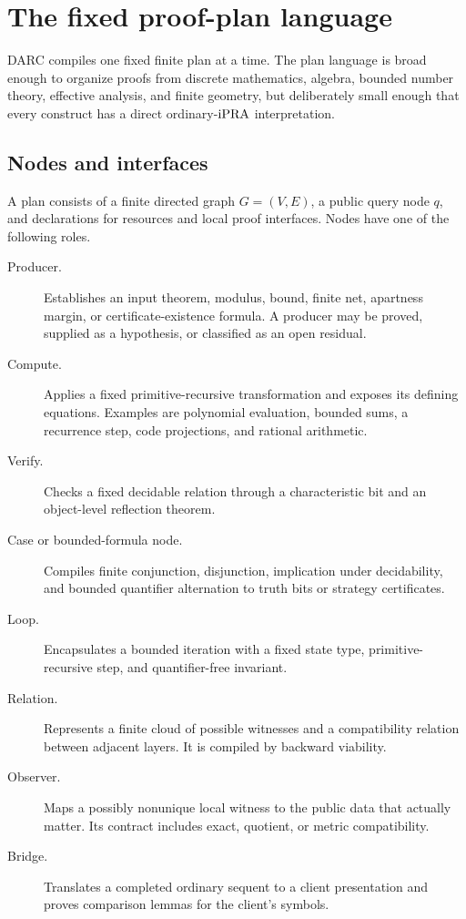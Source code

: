 \section{The fixed proof-plan language}
\label{sec:plan}

DARC compiles one fixed finite plan at a time.  The plan language is broad
enough to organize proofs from discrete mathematics, algebra, bounded number
theory, effective analysis, and finite geometry, but deliberately small enough
that every construct has a direct ordinary-\(\mathrm{iPRA}\) interpretation.

\subsection{Nodes and interfaces}

A plan consists of a finite directed graph \(G=(V,E)\), a public query node
\(q\), and declarations for resources and local proof interfaces.  Nodes have
one of the following roles.

\begin{description}
  \item[Producer.] Establishes an input theorem, modulus, bound, finite net,
  apartness margin, or certificate-existence formula.  A producer may be
  proved, supplied as a hypothesis, or classified as an open residual.

  \item[Compute.] Applies a fixed primitive-recursive transformation and
  exposes its defining equations.  Examples are polynomial evaluation,
  bounded sums, a recurrence step, code projections, and rational arithmetic.

  \item[Verify.] Checks a fixed decidable relation through a characteristic
  bit and an object-level reflection theorem.

  \item[Case or bounded-formula node.] Compiles finite conjunction,
  disjunction, implication under decidability, and bounded quantifier
  alternation to truth bits or strategy certificates.

  \item[Loop.] Encapsulates a bounded iteration with a fixed state type,
  primitive-recursive step, and quantifier-free invariant.

  \item[Relation.] Represents a finite cloud of possible witnesses and a
  compatibility relation between adjacent layers.  It is compiled by backward
  viability.

  \item[Observer.] Maps a possibly nonunique local witness to the public data
  that actually matter.  Its contract includes exact, quotient, or metric
  compatibility.

  \item[Bridge.] Translates a completed ordinary sequent to a client
  presentation and proves comparison lemmas for the client's symbols.
\end{description}


